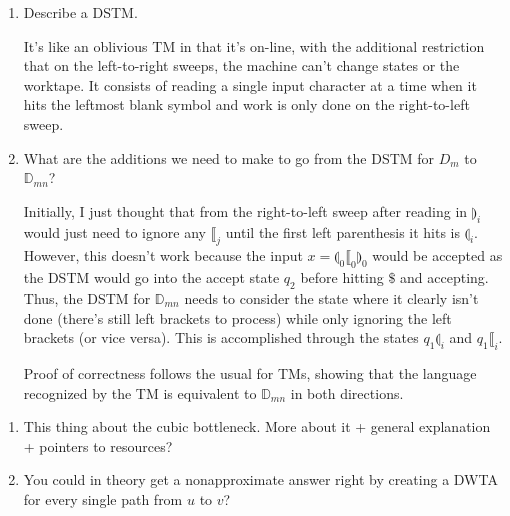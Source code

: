 \documentclass[12pt]{article}
\theoremstyle{remark}
\theoremstyle{remark}
\begin{document}
\begin{enumerate}
  \item Describe a DSTM.
  
  It's like an oblivious TM in that it's on-line, with the additional restriction that on the left-to-right sweeps, the machine can't change states or the worktape. It consists of reading a single input character at a time when it hits the leftmost blank symbol and work is only done on the right-to-left sweep.

  \item What are the additions we need to make to go from the DSTM for $D_m$ to $\mathbb{D}_{mn}$?
  
  Initially, I just thought that from the right-to-left sweep after reading in $\rrparenthesis_i$ would just need to ignore any $\llbracket_j$ until the first left parenthesis it hits is $\llparenthesis_i$. However, this doesn't work because the input $x=\llparenthesis_0 \llbracket_0 \rrparenthesis_0$ would be accepted as the DSTM would go into the accept state $q_2$ before hitting $\$$ and accepting. Thus, the DSTM for $\mathbb{D}_{mn}$ needs to consider the state where it clearly isn't done (there's still left brackets to process) while only ignoring the left brackets (or vice versa). This is accomplished through the states $q_1 \llparenthesis_i$ and $q_1 \llbracket_i$.

  Proof of correctness follows the usual for TMs, showing that the language recognized by the TM is equivalent to $\mathbb{D}_{mn}$ in both directions.
\end{enumerate}

\begin{enumerate}
  \item This thing about the cubic bottleneck. More about it + general explanation + pointers to resources?
  \item You could in theory get a nonapproximate answer right by creating a DWTA for every single path from $u$ to $v$?
\end{enumerate}
\end{document}
